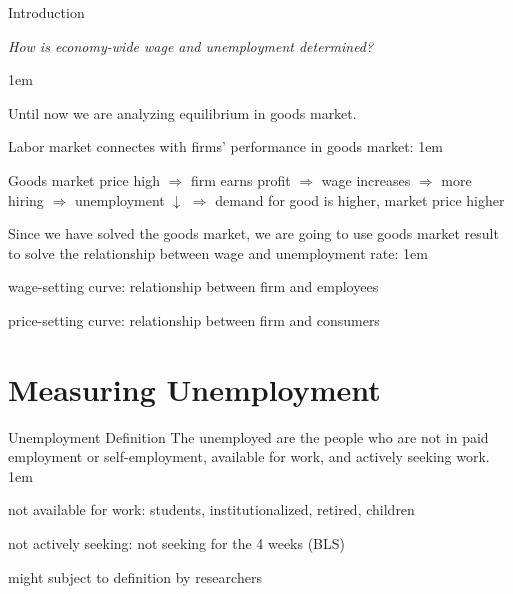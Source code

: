 \documentclass[11pt,aspectratio=43,usenames,dvipsnames]{beamer}
\let\olditemize=\itemize
\let\endolditemize=\enditemize
\renewenvironment{itemize}{\olditemize \itemsep1em}{\endolditemize}
\theoremstyle{definition}
\begin{document}
\begin{frame}{Introduction}
\label{slide:Introduction}

\begin{center}
    \textit{How is economy-wide wage and unemployment determined?}
\end{center}

\begin{itemize}
    \item Until now we are analyzing equilibrium in \alert{goods market}.
    \item \alert{Labor market} connectes with firms' performance in goods market:
    \begin{itemize}
        \item Goods market price high $ \Rightarrow  $ firm earns profit $ \Rightarrow  $ wage increases $ \Rightarrow  $ more hiring $ \Rightarrow  $ unemployment $ \downarrow  $ $ \Rightarrow  $ demand for good is higher, market price higher
    \end{itemize}
    \item Since we have solved the goods market, we are going to use goods market result to solve the relationship between \alert{wage} and \alert{unemployment rate}:
    \begin{itemize}
        \item wage-setting curve: relationship between firm and \alert{employees}
        \item price-setting curve: relationship between firm and \alert{consumers}
    \end{itemize}
\end{itemize}

\end{frame}

\section[Unemployment]{Measuring Unemployment}
\label{sec:Measuring_Unemployment}

\begin{frame}{Unemployment Definition}
\label{slide:Unemployment_Definition}
    The unemployed are the people who are not in \alert{paid employment or self-employment}, \alert{available} for work, and \alert{actively seeking} work.
    \begin{itemize}
        \item not available for work: students, institutionalized, retired, children
        \item not actively seeking: not seeking for the 4 weeks (BLS)
        \item might subject to definition by researchers
    \end{itemize}
\end{frame}
\end{document}
